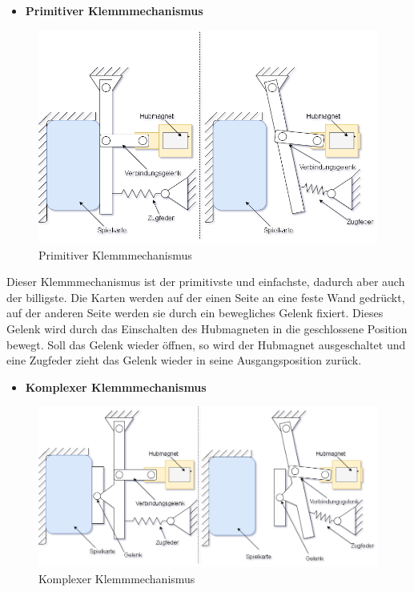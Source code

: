 \begin{itemize}
    \item \textbf{Primitiver Klemmmechanismus}
\end{itemize}

\begin{figure}[H]
    \centering
    \includegraphics[scale=0.5,page=1]{fig/mech/Kartenausgabe_1}
    \caption{Primitiver Klemmmechanismus}
\end{figure}

Dieser Klemmmechanismus ist der primitivste und einfachste, dadurch aber auch der billigste.
Die Karten werden auf der einen Seite an eine feste Wand gedrückt, auf der anderen Seite werden sie durch ein bewegliches Gelenk fixiert.
Dieses Gelenk wird durch das Einschalten des Hubmagneten in die geschlossene Position bewegt.
Soll das Gelenk wieder öffnen, so wird der Hubmagnet ausgeschaltet und eine Zugfeder zieht das Gelenk wieder in seine Ausgangsposition zurück.

\begin{itemize}
    \item \textbf{Komplexer Klemmmechanismus}
\end{itemize}

\begin{figure}[H]
    \centering
    \includegraphics[scale=0.5,page=1]{fig/mech/Kartenausgabe_2}
    \caption{Komplexer Klemmmechanismus}
\end{figure}

